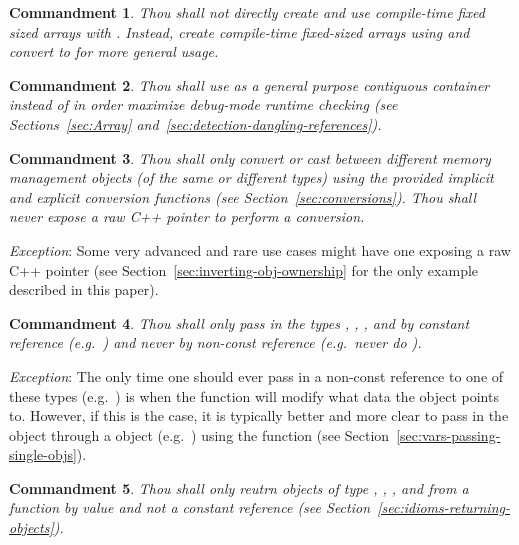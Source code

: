 \documentclass[pdf,ps2pdf,11pt]{SANDreport}
\newtheorem{commandment}{Commandment}
\begin{document}
\begin{commandment}
Thou shall not directly create and use compile-time fixed sized arrays
with {}.  Instead, create compile-time fixed-sized arrays
using {} and convert to
{} for more general usage.
\end{commandment}

\begin{commandment}
Thou shall use {} as a general purpose contiguous
container instead of {} in order maximize debug-mode
runtime checking (see Sections~\ref{sec:Array}
and~\ref{sec:detection-dangling-references}).
\end{commandment}

\begin{commandment}
Thou shall only convert or cast between different memory management
objects (of the same or different types) using the provided implicit
and explicit conversion functions (see Section~\ref{sec:conversions}).
Thou shall never expose a raw C++ pointer to perform a conversion.
\end{commandment}

{}\textit{Exception}: Some very advanced and rare use cases might have
one exposing a raw C++ pointer (see
Section~\ref{sec:inverting-obj-ownership} for the only example
described in this paper).

\begin{commandment}
Thou shall only pass in the types {},
{}, {}, and
{} by constant reference (e.g.\
{}) and never by non-const reference (e.g.\
never do {}).
\end{commandment}

{}\textit{Exception}: The only time one should ever pass in a
non-const reference to one of these types (e.g.\ {}\ttt{RCP<T>
\&a}) is when the function will modify what data the object points to.
However, if this is the case, it is typically better and more clear to
pass in the object through a {}\ttt{Ptr} object (e.g.\
{}) using the {} function
(see Section~\ref{sec:vars-passing-single-objs}).

\begin{commandment}
Thou shall only reutrn objects of type {}\ttt{Ptr}, {},
{}, and {} from a function by value and
not a constant reference (see
Section~\ref{sec:idioms-returning-objects}).
\end{commandment}
\end{document}
